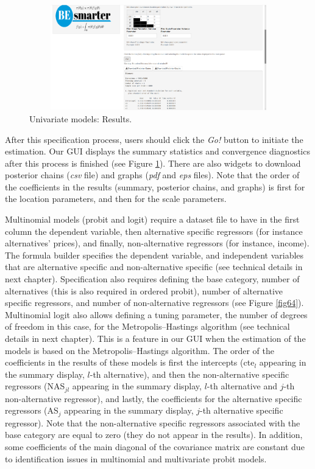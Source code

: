\begin{figure}
	\includegraphics[width=340pt, height=130pt]{Chapters/chapterGUI/figures/Figure3.png}
	\caption[List of figure caption goes here]{Univariate models: Results.}\label{fig63}
\end{figure}

After this specification process, users should click the \textit{Go!} button to initiate the estimation. Our GUI displays the summary statistics and convergence diagnostics after this process is finished (see Figure \ref{fig63}). There are also widgets to download posterior chains (\textit{csv} file) and graphs (\textit{pdf} and \textit{eps} files). Note that the order of the coefficients in the results (summary, posterior chains, and graphs) is first for the location parameters, and then for the scale parameters.

Multinomial models (probit and logit) require a dataset file to have in the first column the dependent variable, then alternative specific regressors (for instance alternatives' prices), and finally, non-alternative regressors (for instance, income). The formula builder specifies the dependent variable, and independent variables that are alternative specific and non-alternative specific (see technical details in next chapter). Specification also requires defining the base category, number of alternatives (this is also required in ordered probit), number of alternative specific regressors, and number of non-alternative regressors (see Figure \ref{fig64}). Multinomial logit also allows defining a tuning parameter, the number of degrees of freedom in this case, for the Metropolis--Hastings algorithm (see technical details in next chapter). This is a feature in our GUI when the estimation of the models is based on the Metropolis--Hastings algorithm. The order of the coefficients in the results of these models is first the intercepts (cte$_l$ appearing in the summary display, $l$-th alternative), and then the non-alternative specific regressors (NAS$_{jl}$ appearing in the summary display, $l$-th alternative and $j$-th non-alternative regressor), and lastly, the coefficients for the alternative specific regressors (AS$_{j}$ appearing in the summary display, $j$-th alternative specific regressor). Note that the non-alternative specific regressors associated with the base category are equal to zero (they do not appear in the results). In addition, some coefficients of the main diagonal of the covariance matrix are constant due to identification issues in multinomial and multivariate probit models.

